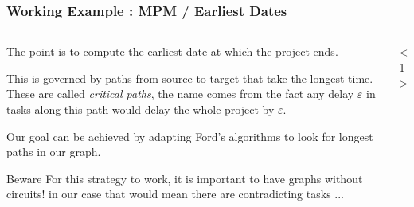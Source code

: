 \documentclass[32pt,aspectratio=169]{beamer}
\begin{document}
\begin{frame}
  \frametitle{Working Example : MPM / Earliest Dates}
  \begin{columns}
    \begin{column}{.6\textwidth}
      The point is to compute the earliest date at which the project
      ends. 
      
      \vspace{.3\baselineskip}
      This is governed by paths from source to target that take
      the longest time. These are called \emph{critical
        paths}, the name comes from the fact any delay $\varepsilon$
      in tasks along this path would delay the whole project by
      $\varepsilon$.

      \vspace{.3\baselineskip} 
      Our goal can be achieved by adapting Ford's algorithms to look
      for longest paths in our graph.
      
      \vspace{.3\baselineskip}
      \begin{alertblock}{Beware}
        For this strategy to work, it is
        important to have graphs without circuits! in our case that
        would mean there are contradicting tasks ...
      \end{alertblock}
    \end{column}
    \begin{column}{.4\textwidth}
      \begin{onlyenv}<1>
        

\end{onlyenv}
\end{column}
\end{columns}
\end{frame}
\end{document}
